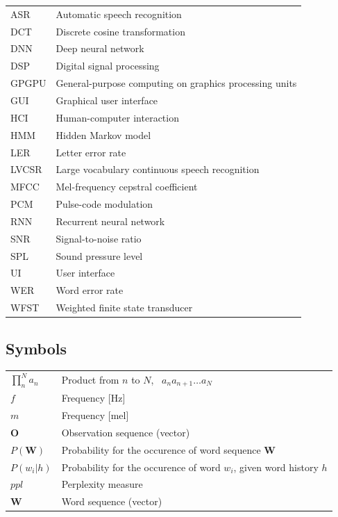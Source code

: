 \documentclass[english, 12pt, a4paper, pdftex, elec, utf8]{aaltothesis}
\begin{document}
\begin{tabular}{ll}
ASR         	 & Automatic speech recognition \\
DCT				& Discrete cosine transformation \\
DNN				& Deep neural network \\
DSP				& Digital signal processing \\
GPGPU 		  & General-purpose computing on graphics processing units \\
GUI      		  & Graphical user interface \\
HCI  			  & Human-computer interaction \\
HMM   			& Hidden Markov model \\
LER				 & Letter error rate \\
LVCSR 		   & Large vocabulary continuous speech recognition \\
MFCC  		   & Mel-frequency cepstral coefficient \\
PCM  		    & Pulse-code modulation \\
RNN				& Recurrent neural network \\
SNR				 & Signal-to-noise ratio \\
SPL				 & Sound pressure level \\
UI	       		   & User interface \\
WER    			& Word error rate \\
WFST		  & Weighted finite state transducer
\end{tabular}

\subsection*{Symbols}

\begin{tabular}{ll}
	$\displaystyle \prod_{n}^{N} a_{n} $ & Product from $n$ to $N$, \ $a_n a_{n+1} \dots a_{N}$ \\
	$f$              	 & Frequency [Hz] \\
	$m$					& Frequency [mel] \\
	$\bm{O}$		& Observation sequence (vector) \\
	$P(\bm{W})$   & Probability for the occurence of word sequence $\bm{W}$ \\
	$P(w_i|h)$       & Probability for the occurence of word $w_i$, given word history $h$ \\
	$ppl$				& Perplexity measure \\
	$\bm{W}$		& Word sequence (vector) \\
	
\end{tabular}
\end{document}
